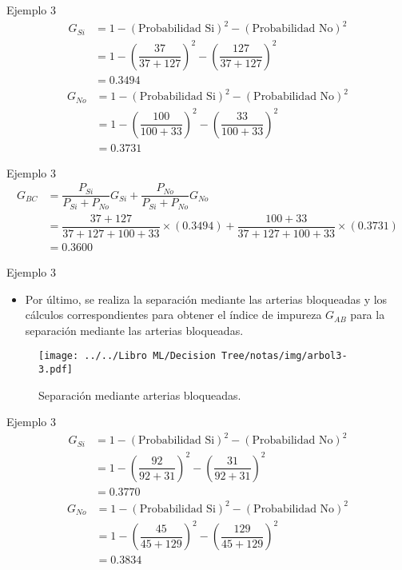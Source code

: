 \documentclass[11pt,aspectratio=169]{beamer}
\begin{document}
\begin{frame}{Ejemplo 3}
	\begin{align*}
		G_{Si} &= 1 - (\mbox{Probabilidad Si})^2 - (\mbox{Probabilidad No})^2  \\
			&= 1-\left(\dfrac{37}{37+127}\right)^2 -\left(\dfrac{127}{37+127} \right)^2\\
			&= 0.3494
	\end{align*}\pause
	\begin{align*}
		G_{No} &= 1- (\mbox{Probabilidad Si})^2 - (\mbox{Probabilidad No})^2  \\
			&= 1-\left(\dfrac{100}{100+33}\right)^2 -\left(\dfrac{33}{100+33} \right)^2\\
			&= 0.3731
	\end{align*}
\end{frame}

\begin{frame}{Ejemplo 3}
	\begin{align*}
		G_{BC} &= \dfrac{P_{Si}}{P_{Si} + P_{No}}G_{Si} + \dfrac{P_{No}}{P_{Si}+P_{No}}G_{No} \\
			&= \dfrac{37+127}{37+127+100+33}\times (0.3494) + \dfrac{100+33}{37+127+100+33}\times (0.3731) \\
			&= 0.3600
	\end{align*}
\end{frame}

\begin{frame}{Ejemplo 3}
	\begin{itemize}
		\item Por último, se realiza la separación mediante las arterias bloqueadas y los cálculos 
		correspondientes para obtener el índice de impureza $G_{AB}$ para la separación mediante las 
		arterias bloqueadas.
	\end{itemize}\pause
	
	\begin{figure}[H]
		\centering
		\texttt{[image: ../../Libro ML/Decision Tree/notas/img/arbol3-3.pdf]}
		\caption{Separación mediante arterias bloqueadas.}
		\label{fig:arbol3-3}
	\end{figure}
\end{frame}

\begin{frame}{Ejemplo 3}
	\begin{align*}
		G_{Si} &= 1 - (\mbox{Probabilidad Si})^2 - (\mbox{Probabilidad No})^2  \\
			&= 1-\left(\dfrac{92}{92+31}\right)^2 - \left(\dfrac{31}{92+31} \right)^2\\
			&= 0.3770
	\end{align*}\pause
	\begin{align*}
		G_{No} &= 1 - (\mbox{Probabilidad Si})^2 - (\mbox{Probabilidad No})^2  \\
			&= 1-\left(\dfrac{45}{45+129}\right)^2 - \left(\dfrac{129}{45+129}\right)^2\\
			&= 0.3834
	\end{align*}
\end{frame}
\end{document}
